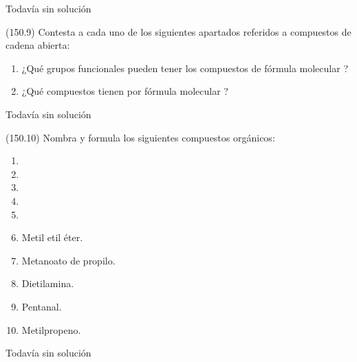 \documentclass[10pt,a5paper,twoside]{article}
\begin{document}
  \begin{solution}[print=false]
    Todavía sin solución
  \end{solution}




  \begin{exercise}[
      tags    = {},
      topics  = {química, química orgánica, orgánica},
      source  = {FQ 1B MGH 2016, p150, e9},
    ]
    (150.9) Contesta a cada uno de los siguientes apartados referidos a
    compuestos de cadena abierta:
    \begin{enumerate}
      \item ¿Qué grupos funcionales pueden tener los compuestos de
      fórmula molecular ?
      \item ¿Qué compuestos tienen por fórmula molecular ?
    \end{enumerate}
  \end{exercise}

  \begin{solution}[print=false]
    Todavía sin solución
  \end{solution}




  \begin{exercise}[
      tags    = {},
      topics  = {química, química orgánica, orgánica},
      source  = {FQ 1B MGH 2016, p150, e10},
    ]
    (150.10) Nombra y formula los siguientes compuestos orgánicos:
    \begin{enumerate}
      \item {}
      \item {}
      \item {}
      \item {}
      \item {}
      \item Metil etil éter.
      \item Metanoato de propilo.
      \item Dietilamina.
      \item Pentanal.
      \item Metilpropeno.
    \end{enumerate}
  \end{exercise}

  \begin{solution}[print=false]
    Todavía sin solución
  \end{solution}
\end{document}
